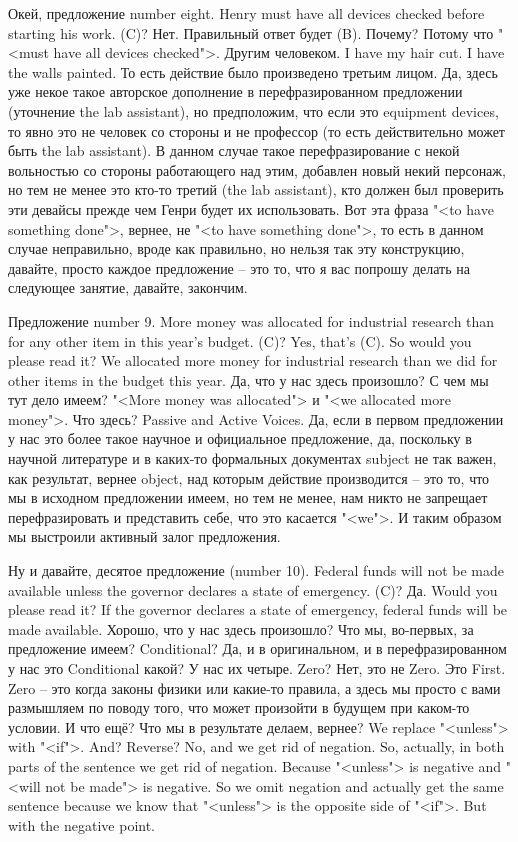 \documentclass[main.tex]{subfiles}
\begin{document}
Окей, предложение number eight.
Henry must have all devices checked before starting his work.
(C)?
Нет.
Правильный ответ будет (B).
Почему?
Потому что "<must have all devices checked">.
Другим человеком.
I have my hair cut.
I have the walls painted.
То есть действие было произведено третьим лицом.
Да, здесь уже некое такое авторское дополнение в перефразированном предложении (уточнение the lab assistant), но предположим, что если это equipment devices, то явно это не человек со стороны и не профессор (то есть действительно может быть the lab assistant).
В данном случае такое перефразирование с некой вольностью со стороны работающего над этим, добавлен новый некий персонаж, но тем не менее это кто-то третий (the lab assistant), кто должен был проверить эти девайсы прежде чем Генри будет их использовать.
Вот эта фраза "<to have something done">, вернее, не "<to have something done">, то есть в данном случае неправильно, вроде как правильно, но нельзя так эту конструкцию, давайте, просто каждое предложение -- это то, что я вас попрошу делать на следующее занятие, давайте, закончим.

Предложение number 9.
More money was allocated for industrial research than for any other item in this year's budget.
(C)?
Yes, that's (C).
So would you please read it?
We allocated more money for industrial research than we did for other items in the budget this year.
Да, что у нас здесь произошло?
С чем мы тут дело имеем?
"<More money was allocated"> и "<we allocated more money">.
Что здесь?
Passive and Active Voices.
Да, если в первом предложении у нас это более такое научное и официальное предложение, да, поскольку в научной литературе и в каких-то формальных документах subject не так важен, как результат, вернее object, над которым действие производится -- это то, что мы в исходном предложении имеем, но тем не менее, нам никто не запрещает перефразировать и представить себе, что это касается "<we">.
И таким образом мы выстроили активный залог предложения.

Ну и давайте, десятое предложение (number 10).
Federal funds will not be made available unless the governor declares a state of emergency.
(C)?
Да.
Would you please read it?
If the governor declares a state of emergency, federal funds will be made available.
Хорошо, что у нас здесь произошло?
Что мы, во-первых, за предложение имеем?
Conditional?
Да, и в оригинальном, и в перефразированном у нас это Conditional какой?
У нас их четыре.
Zero?
Нет, это не Zero.
Это First.
Zero -- это когда законы физики или какие-то правила, а здесь мы просто с вами размышляем по поводу того, что может произойти в будущем при каком-то условии.
И что ещё?
Что мы в результате делаем, вернее?
We replace "<unless"> with "<if">.
And?
Reverse?
No, and we get rid of negation.
So, actually, in both parts of the sentence we get rid of negation.
Because "<unless"> is negative and "<will not be made"> is negative.
So we omit negation and actually get the same sentence because we know that "<unless"> is the opposite side of "<if">.
But with the negative point.
\end{document}
